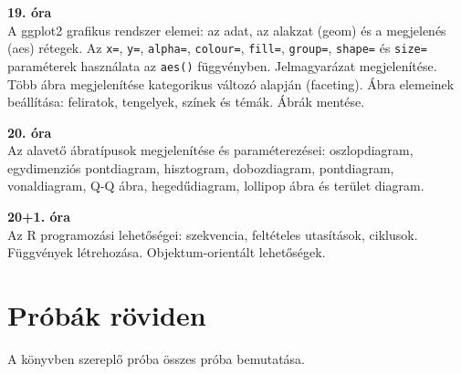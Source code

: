 \documentclass[
]{book}
\begin{document}
\textbf{19. óra}\\
A ggplot2 grafikus rendszer elemei: az adat, az alakzat (geom) és a megjelenés (aes) rétegek. Az \texttt{x=}, \texttt{y=}, \texttt{alpha=}, \texttt{colour=}, \texttt{fill=}, \texttt{group=}, \texttt{shape=} és \texttt{size=} paraméterek használata az \texttt{aes()} függvényben. Jelmagyarázat megjelenítése. Több ábra megjelenítése kategorikus változó alapján (faceting). Ábra elemeinek beállítása: feliratok, tengelyek, színek és témák. Ábrák mentése.

\textbf{20. óra}\\
Az alavető ábratípusok megjelenítése és paraméterezései: oszlopdiagram, egydimenziós pontdiagram, hisztogram, dobozdiagram, pontdiagram, vonaldiagram, Q-Q ábra, hegedűdiagram, lollipop ábra és terület diagram.

\textbf{20+1. óra}\\
Az R programozási lehetőségei: szekvencia, feltételes utasítások, ciklusok. Függvények létrehozása. Objektum-orientált lehetőségek.

\hypertarget{probak}{%
\chapter{Próbák röviden}\label{probak}}

A könyvben szereplő próba összes próba bemutatása.
\end{document}
